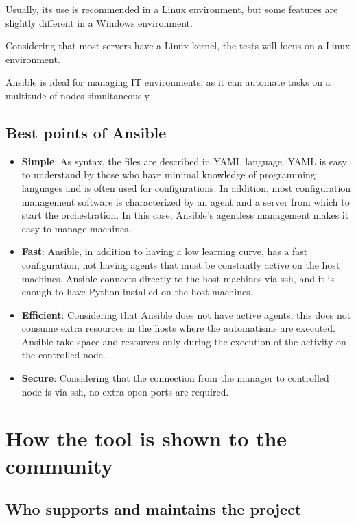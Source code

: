 \documentclass[12pt,a4paper,openright,twoside]{book}
\begin{document}
Usually, its use is recommended in a Linux environment, but some features are slightly different in a Windows environment.


Considering that most servers have a Linux kernel, the tests will focus on a Linux environment.


Ansible is ideal for managing IT environments, as it can automate tasks on a multitude of nodes simultaneously.

\subsection{Best points of Ansible}
\begin{itemize}
    \item \textbf{Simple}: As syntax, the files are described in YAML language. YAML is easy to understand by those who have minimal knowledge of programming languages and is often used for configurations. In addition, most configuration management software is characterized by an agent and a server from which to start the orchestration. In this case, Ansible's agentless management makes it easy to manage machines.
    \item \textbf{Fast}: Ansible, in addition to having a low learning curve, has a fast configuration, not having agents that must be constantly active on the host machines. Ansible connects directly to the host machines via ssh, and it is enough to have Python installed on the host machines.
    \item \textbf{Efficient}: Considering that Ansible does not have active agents, this does not consume extra resources in the hosts where the automatisms are executed. Ansible take space and resources only during the execution of the activity on the controlled node.
    \item \textbf{Secure}: Considering that the connection from the manager to controlled node is via ssh, no extra open ports are required.
\end{itemize}

\section{How the tool is shown to the community}

\subsection{Who supports and maintains the project}
\end{document}
